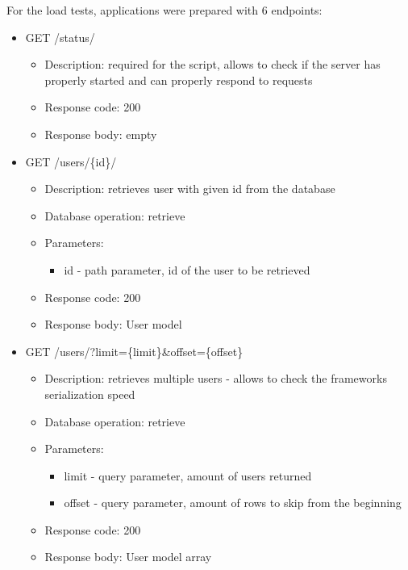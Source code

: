 For the load tests, applications were prepared with 6 endpoints:
\begin{itemize}
    \item GET /status/
          \begin{itemize}
              \item Description: required for the script, allows to check if the server has properly started and can properly respond to requests
              \item Response code: 200
              \item Response body: empty
          \end{itemize}
    \item GET /users/\{id\}/
          \begin{itemize}
              \item Description: retrieves user with given id from the database
              \item Database operation: retrieve
              \item Parameters:
                    \begin{itemize}
                        \item id - path parameter, id of the user to be retrieved
                    \end{itemize}
              \item Response code: 200
              \item Response body: User model
          \end{itemize}
    \item GET /users/?limit=\{limit\}\&offset=\{offset\}
          \begin{itemize}
              \item Description: retrieves multiple users - allows to check the frameworks serialization speed
              \item Database operation: retrieve
              \item Parameters:
                    \begin{itemize}
                        \item limit - query parameter, amount of users returned
                        \item offset - query parameter, amount of rows to skip from the beginning
                    \end{itemize}
              \item Response code: 200
              \item Response body: User model array

\end{itemize}
\end{itemize}
